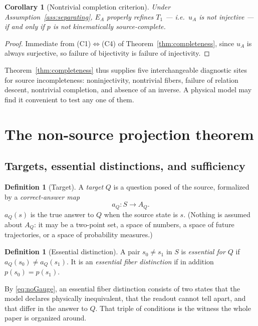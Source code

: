 \documentclass[11pt,reqno]{amsart}
\theoremstyle{plain}
\newtheorem{corollary}[theorem]{Corollary}
\theoremstyle{definition}
\newtheorem{definition}[theorem]{Definition}
\theoremstyle{remark}
\begin{document}
\begin{corollary}[Nontrivial completion criterion]\label{cor:nontrivialcompletion}
Under Assumption~\ref{ass:separating}, $E_A$ properly refines $T_1$ --- i.e.\ $u_A$ is not injective --- if and only if $p$ is not kinematically source-complete.
\end{corollary}

\begin{proof}
Immediate from (C1)$\Leftrightarrow$(C4) of Theorem~\ref{thm:completeness}, since $u_A$ is always surjective, so failure of bijectivity is failure of injectivity.
\end{proof}

Theorem~\ref{thm:completeness} thus supplies five interchangeable diagnostic sites for source incompleteness: noninjectivity, nontrivial fibers, failure of relation descent, nontrivial completion, and absence of an inverse. A physical model may find it convenient to test any one of them.

\section{The non-source projection theorem}\label{sec:nonsource}

\subsection{Targets, essential distinctions, and sufficiency}

\begin{definition}[Target]\label{def:target}
A \emph{target} $Q$ is a question posed of the source, formalized by a \emph{correct-answer map}
\[
a_Q\colon S\longrightarrow A_Q .
\]
$a_Q(s)$ is the true answer to $Q$ when the source state is $s$. (Nothing is assumed about $A_Q$: it may be a two-point set, a space of numbers, a space of future trajectories, or a space of probability measures.)
\end{definition}

\begin{definition}[Essential distinction]\label{def:essential}
A pair $s_0\neq s_1$ in $S$ is \emph{essential for $Q$} if $a_Q(s_0)\neq a_Q(s_1)$. It is an \emph{essential fiber distinction} if in addition $p(s_0)=p(s_1)$.
\end{definition}

By \eqref{eq:noGauge}, an essential fiber distinction consists of two states that the model declares physically inequivalent, that the readout cannot tell apart, and that differ in the answer to $Q$. That triple of conditions is the witness the whole paper is organized around.
\end{document}
